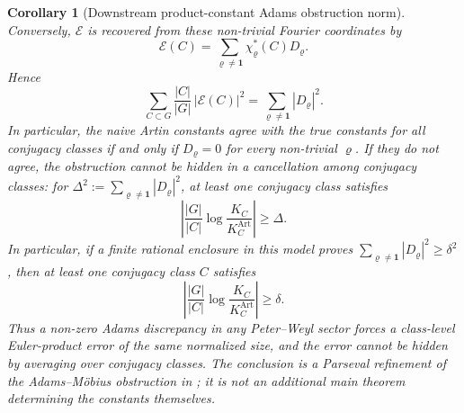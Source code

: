 \documentclass[11pt,a4paper]{amsart}
\theoremstyle{plain}
\newtheorem{corollary}[theorem]{Corollary}
\theoremstyle{definition}
\theoremstyle{remark}
\begin{document}
\begin{corollary}[Downstream product-constant Adams obstruction norm]
  Conversely, \(\mathcal E\) is recovered from these non-trivial Fourier
  coordinates by
  \begin{equation}\label{eq:adams-obstruction-bound-forward}
    \mathcal E(C)=
    \sum_{\varrho\neq\mathbf1}\chi_\varrho^\ast(C)D_\varrho .
  \end{equation}
  Hence
  \begin{equation}\label{eq:adams-obstruction-bound-parseval}
    \sum_{C\subset G}\frac{|C|}{|G|}\,|\mathcal E(C)|^2
    =
    \sum_{\varrho\neq\mathbf1}|D_\varrho|^2.
  \end{equation}
  In particular, the naive Artin constants agree with the true constants for
  all conjugacy classes if and only if \(D_\varrho=0\) for every non-trivial
  \(\varrho\).  If they do not agree, the obstruction cannot be hidden in a
  cancellation among conjugacy classes: for
  \(\Delta^2:=\sum_{\varrho\neq\mathbf1}|D_\varrho|^2\), at least one
  conjugacy class satisfies
  \begin{equation}\label{eq:adams-obstruction-bound-sup-lower-bound}
    \left|
      \frac{|G|}{|C|}
      \log\frac{K_C}{K_C^{\mathrm{Art}}}
    \right|
    \ge \Delta .
  \end{equation}
  In particular, if a finite rational enclosure in this model proves
  \(\sum_{\varrho\neq\mathbf1}|D_\varrho|^2\ge \delta^2\), then at least
  one conjugacy class \(C\) satisfies
  \begin{equation}\label{eq:adams-obstruction-bound-lower-bound}
    \left|
      \frac{|G|}{|C|}
      \log\frac{K_C}{K_C^{\mathrm{Art}}}
    \right|
    \ge \delta.
  \end{equation}
  Thus a non-zero Adams discrepancy in any Peter--Weyl sector forces a
  class-level Euler-product error of the same normalized size, and the
  error cannot be hidden by averaging over conjugacy classes.  The conclusion
  is a Parseval refinement of the Adams--M\"obius obstruction in
  ; it is not an additional main
  theorem determining the constants themselves.
\end{corollary}
\end{document}
